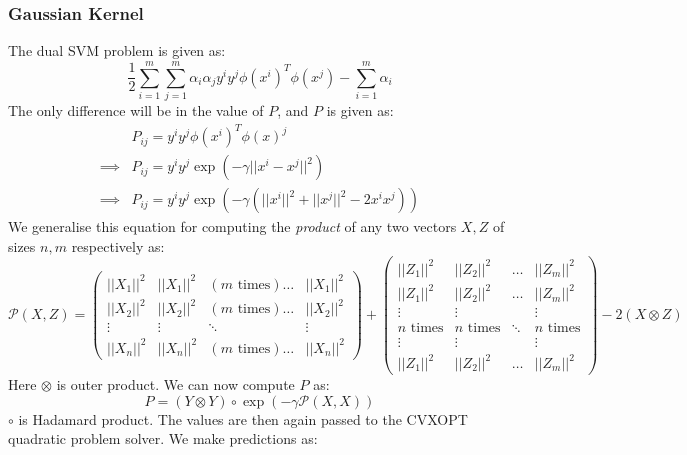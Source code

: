\documentclass[11pt]{article}
\begin{document}
\subsubsection{Gaussian Kernel}
The dual SVM problem is given as:
\begin{equation}
  \frac{1}{2}\sum_{i=1}^m\sum_{j=1}^m \alpha_i \alpha_j y^i y^j \phi(x^i)^T \phi(x^j) - \sum_{i=1}^m \alpha_i
\end{equation}
The only difference will be in the value of $P$, and $P$ is given as:
\begin{equation}
  \begin{split}
    &P_{ij} = y^i y^j \phi(x^i)^T \phi(x)^j\\
    \implies &P_{ij} = y^i y^j \exp(-\gamma ||x^i - x^j||^2)\\
    \implies &P_{ij} = y^i y^j \exp(-\gamma (||x^i||^2 + ||x^j||^2 - 2 x^i x^j))
  \end{split}
\end{equation}
We generalise this equation for computing the \textit{product} of any two vectors $X, Z$ of sizes $n,m$ respectively as:
\begin{equation}
  \mathcal{P}(X, Z) =
  \begin{pmatrix}
    ||X_1||^2 & ||X_1||^2 & (m \text{ times})\ldots & ||X_1||^2\\
    ||X_2||^2 & ||X_2||^2 & (m \text{ times})\ldots & ||X_2||^2\\
    \vdots & \vdots & \ddots & \vdots\\
    ||X_n||^2 & ||X_n||^2 & (m \text{ times})\ldots & ||X_n||^2
  \end{pmatrix} +
  \begin{pmatrix}
    ||Z_1||^2 & ||Z_2||^2 & \ldots & ||Z_m||^2\\
    ||Z_1||^2 & ||Z_2||^2 & \ldots & ||Z_m||^2\\
    \vdots & \vdots & & \vdots\\
    n\text{ times} & n\text{ times} & \ddots & n\text{ times}\\
    \vdots & \vdots & & \vdots\\
    ||Z_1||^2 & ||Z_2||^2 & \ldots & ||Z_m||^2
  \end{pmatrix} -
  2 (X \otimes Z)
\end{equation}
Here $\otimes$ is outer product. We can now compute $P$ as:
\begin{equation}
  P = (Y \otimes Y) \circ \exp(-\gamma \mathcal{P}(X, X))
\end{equation}
$\circ$ is Hadamard product. The values are then again passed to the CVXOPT quadratic problem solver. We make predictions as:
\end{document}
